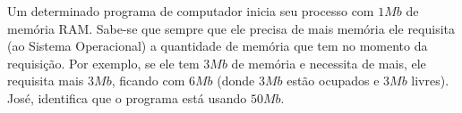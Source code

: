 \documentclass{exam}
\begin{document}
\begin{questions}

    \question Um determinado programa de computador inicia seu processo com $1Mb$ de memória RAM.
    Sabe-se que sempre que ele precisa de mais memória ele requisita (ao Sistema Operacional) 
    a quantidade de memória que tem no momento da requisição. Por exemplo, se ele tem $3Mb$
    de memória e necessita de mais, ele requisita mais $3Mb$, ficando com $6Mb$ (donde $3Mb$ estão ocupados e $3Mb$ livres).
    José, identifica que o programa está usando $50Mb$.
\end{questions}
\end{document}
